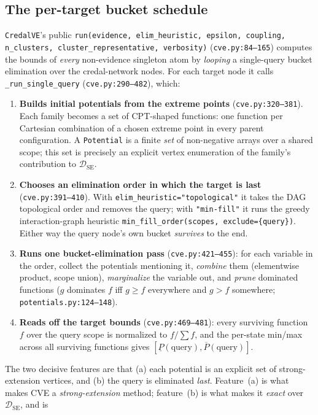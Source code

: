 \documentclass[11pt]{article}
\newcommand{\lo}{\underline}
\newcommand{\hi}{\overline}
\newcommand{\DSE}{\mathcal{D}_{\mathrm{SE}}}
\newcommand{\CVE}{\texttt{CredalVE}}
\begin{document}
\subsection{The per-target bucket schedule}\label{sec:schedule}
\CVE{}'s public \texttt{run(evidence, elim\_heuristic, epsilon, coupling, n\_clusters,
cluster\_representative, verbosity)}
(\texttt{cve.py:84--165}) computes the bounds of \emph{every} non-evidence singleton atom by
\emph{looping} a single-query bucket elimination over the credal-network nodes. For each target node
it calls \texttt{\_run\_single\_query} (\texttt{cve.py:290--482}), which:
\begin{enumerate}
  \item \textbf{Builds initial potentials from the extreme points} (\texttt{cve.py:320--381}). Each
    family becomes a set of CPT-shaped functions: one function per Cartesian combination of a chosen
    extreme point in every parent configuration. A \texttt{Potential} is a finite \emph{set} of
    non-negative arrays over a shared scope; this set is precisely an explicit vertex enumeration of
    the family's contribution to $\DSE$.
  \item \textbf{Chooses an elimination order in which the target is last}
    (\texttt{cve.py:391--410}). With \texttt{elim\_heuristic="topological"} it takes the DAG
    topological order and removes the query; with \texttt{"min-fill"} it runs the greedy
    interaction-graph heuristic \texttt{min\_fill\_order(scopes, exclude=\{query\})}. Either way the
    query node's own bucket \emph{survives} to the end.
  \item \textbf{Runs one bucket-elimination pass} (\texttt{cve.py:421--455}): for each variable in
    the order, collect the potentials mentioning it, \emph{combine} them (elementwise product,
    scope union), \emph{marginalize} the variable out, and \emph{prune} dominated functions
    ($g$ dominates $f$ iff $g\ge f$ everywhere and $g>f$ somewhere; \texttt{potentials.py:124--148}).
  \item \textbf{Reads off the target bounds} (\texttt{cve.py:469--481}): every surviving function
    $f$ over the query scope is normalized to $f/\sum f$, and the per-state min/max across all
    surviving functions gives $[\lo P(\text{query}),\hi P(\text{query})]$.
\end{enumerate}
The two decisive features are that (a) each potential is an explicit set of strong-extension
vertices, and (b) the query is eliminated \emph{last}. Feature~(a) is what makes CVE a
\emph{strong-extension} method; feature~(b) is what makes it \emph{exact} over $\DSE$, and is
\end{document}
